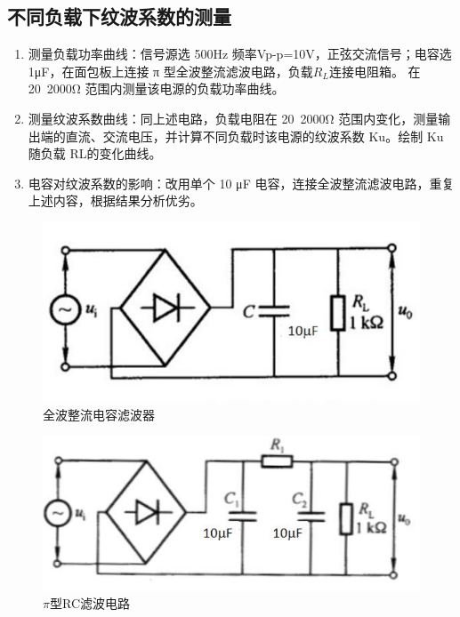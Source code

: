 \documentclass[UTF8]{ctexart}
\begin{document}
\subsection{不同负载下纹波系数的测量}
\begin{enumerate}
    \item 测量负载功率曲线：信号源选 500Hz 频率Vp-p=10V，正弦交流信号；电容选 1μF，在面包板上连接 π 型全波整流滤波电路，负载$R_L$连接电阻箱。
    在 20~2000Ω 范围内测量该电源的负载功率曲线。
    \item 测量纹波系数曲线：同上述电路，负载电阻在 20~2000Ω 范围内变化，测量输出端的直流、交流电压，并计算不同负载时该电源的纹波系数 Ku。绘制 Ku随负载 RL的变化曲线。
    \item 电容对纹波系数的影响：改用单个 10 μF 电容，连接全波整流滤波电路，重复上述内容，根据结果分析优劣。
\end{enumerate}
\begin{figure}[h!]
    \centering
    \includegraphics[scale=0.7]{全波整流电容滤波器.PNG}
    \caption{全波整流电容滤波器}
\end{figure}
\begin{figure}[h!]
    \centering
    \includegraphics[scale=0.7]{pi型RC滤波电路.PNG}
    \caption{$\pi$型RC滤波电路}
\end{figure}
\end{document}
